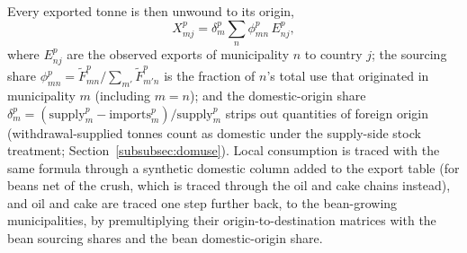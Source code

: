 \documentclass[pdflatex,sn-nature]{sn-jnl}%
\begin{document}
Every exported tonne is then unwound to its origin,
\begin{equation}\label{eq:src2exp}
  X^p_{mj}=\delta^p_m\sum_{n}\phi^p_{mn}\,E^p_{nj},
\end{equation}
where $E^p_{nj}$ are the observed exports of municipality $n$ to country
$j$; the sourcing share
$\phi^p_{mn}=\tilde F^p_{mn}/\sum_{m'}\tilde F^p_{m'n}$ is the fraction
of $n$'s total use that originated in municipality $m$ (including $m=n$);
and the domestic-origin share
$\delta^p_m=(\text{supply}^p_m-\text{imports}^p_m)/\text{supply}^p_m$
strips out quantities of foreign origin (withdrawal-supplied tonnes count as
domestic under the supply-side stock treatment;
Section~\ref{subsubsec:domuse}).
Local consumption is traced with the same formula through a synthetic
domestic column added to the export table (for beans net of the crush, which
is traced through the oil and cake chains instead), and oil and cake are
traced one step further back, to the bean-growing municipalities, by
premultiplying their origin-to-destination matrices with the bean sourcing
shares and the bean domestic-origin share.
\end{document}
